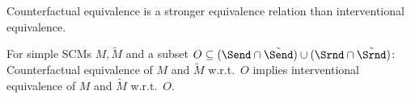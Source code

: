 Counterfactual equivalence is a stronger equivalence relation than interventional equivalence.
\begin{Prp}\label{prp:pearls_ladder_levels_2_and_3}
  For simple SCMs $M, \tilde{M}$ and a subset $O \subseteq (\Send \cap \tilde{\Send}) \cup (\Srnd \cap \tilde{\Srnd})$:
    Counterfactual equivalence of $M$ and $\tilde{M}$ w.r.t.\ $O$ implies interventional equivalence of $M$ and $\tilde{M}$ w.r.t.\ $O$.
\end{Prp}

